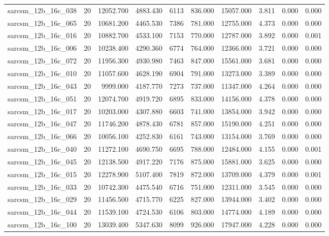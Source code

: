 \begin{tabular}{lrrrrrrrrr}
sarcsm\_12b\_16c\_038 & 20 & 12052.700 & 4883.430 & 6113 & 836.000 & 15057.000 & 3.811 & 0.000 & 0.000 \\
sarcsm\_12b\_16c\_065 & 20 & 10681.200 & 4465.530 & 7386 & 781.000 & 12755.000 & 4.373 & 0.000 & 0.000 \\
sarcsm\_12b\_16c\_016 & 20 & 10882.700 & 4533.100 & 7153 & 770.000 & 12787.000 & 3.892 & 0.000 & 0.001 \\
sarcsm\_12b\_16c\_006 & 20 & 10238.400 & 4290.360 & 6774 & 764.000 & 12366.000 & 3.721 & 0.000 & 0.000 \\
sarcsm\_12b\_16c\_072 & 20 & 11956.300 & 4930.980 & 7463 & 847.000 & 15561.000 & 3.681 & 0.000 & 0.000 \\
sarcsm\_12b\_16c\_010 & 20 & 11057.600 & 4628.190 & 6904 & 791.000 & 13273.000 & 3.389 & 0.000 & 0.000 \\
sarcsm\_12b\_16c\_043 & 20 & 9999.000 & 4187.770 & 7273 & 737.000 & 11347.000 & 4.264 & 0.000 & 0.000 \\
sarcsm\_12b\_16c\_051 & 20 & 12074.700 & 4919.720 & 6895 & 833.000 & 14156.000 & 4.378 & 0.000 & 0.000 \\
sarcsm\_12b\_16c\_017 & 20 & 10203.000 & 4307.880 & 6603 & 741.000 & 13854.000 & 3.942 & 0.000 & 0.000 \\
sarcsm\_12b\_16c\_047 & 20 & 11746.200 & 4878.430 & 6781 & 857.000 & 15190.000 & 4.251 & 0.000 & 0.000 \\
sarcsm\_12b\_16c\_066 & 20 & 10056.100 & 4252.830 & 6161 & 743.000 & 13154.000 & 3.769 & 0.000 & 0.000 \\
sarcsm\_12b\_16c\_040 & 20 & 11272.100 & 4690.750 & 6695 & 788.000 & 12484.000 & 4.155 & 0.000 & 0.001 \\
sarcsm\_12b\_16c\_045 & 20 & 12138.500 & 4917.220 & 7176 & 875.000 & 15881.000 & 3.625 & 0.000 & 0.000 \\
sarcsm\_12b\_16c\_015 & 20 & 12278.900 & 5107.400 & 7819 & 872.000 & 13709.000 & 4.379 & 0.000 & 0.001 \\
sarcsm\_12b\_16c\_033 & 20 & 10742.300 & 4475.540 & 6716 & 751.000 & 12311.000 & 3.545 & 0.000 & 0.000 \\
sarcsm\_12b\_16c\_029 & 20 & 11456.500 & 4715.770 & 6225 & 827.000 & 13944.000 & 3.402 & 0.000 & 0.000 \\
sarcsm\_12b\_16c\_044 & 20 & 11539.100 & 4724.530 & 6106 & 803.000 & 14774.000 & 4.189 & 0.000 & 0.000 \\
sarcsm\_12b\_16c\_100 & 20 & 13039.400 & 5347.630 & 8099 & 926.000 & 17947.000 & 4.228 & 0.000 & 0.000 \\

\end{tabular}
